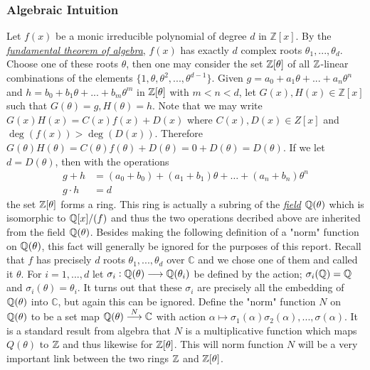   \subsubsection{Algebraic Intuition}
    Let $f(x)$ be a monic irreducible polynomial of degree $d$ in $\mathbb{Z}[x]$. By the \hyperref[fun]{\textit{fundamental theorem of algebra}}, $f(x)$ has exactly $d$ complex roots $\theta_1, ... , \theta_d$. Choose one of these roots $\theta$, then one may consider the set $\mathbb{Z}[\theta]$ of all $\mathbb{Z}$-linear combinations of the elements $\lbrace 1,\theta,\theta^2,...,\theta^{d-1} \rbrace $. Given $g =  a_0 + a_1\theta + ... + a_n\theta^n $ and $ h= b_0 + b_1 \theta + ... + b_m \theta^m $ in $ \mathbb{Z}[\theta]$ with $m < n < d$, let $G(x),H(x) \in \mathbb{Z}[x] $ such that $G(\theta) = g, H(\theta) = h $. Note that we may write $G(x)H(x) = C(x)f(x) + D(x)$ where $C(x), D(x) \in Z[x]$ and $\deg(f(x)) >  \deg (D(x))$. Therefore $ G(\theta) H(\theta) = C(\theta)f(\theta) + D(\theta) = 0 + D(\theta) = D(\theta) $. If we let $d = D(\theta)$, then with the operations  
    \begin{align*}
    g+ h &=  (a_0 + b_0) + (a_1 + b_1) \theta + \dots + (a_n + b_n )\theta^n \\
    g \cdot  h &= d
    \end{align*}
    the set $\mathbb{Z}[\theta]$ forms a ring. This ring is actually a subring of the \hyperref[field]{\textit{field}} $\mathbb{Q}(\theta)$ which is isomorphic to $\mathbb{Q}[x]/(f)$ and thus the two operations decribed above are inherited from the field $\mathbb{Q}(\theta)$. Besides making the following definition of a "norm" function on $\mathbb{Q}(\theta)$, this fact will generally be ignored for the purposes of this report. Recall that $f$ has precisely $d$ roots $\theta_1, ... , \theta_d$ over $\mathbb{C}$ and we chose one of them and called it $\theta$. For $i = 1,...,d$ let $\sigma_i : \mathbb{Q}(\theta) \longrightarrow \mathbb{Q}(\theta_i)$ be defined by the action; $\sigma_i(\mathbb{Q}) = \mathbb{Q}$ and $\sigma_i(\theta) = \theta_i$. It turns out that these $\sigma_i$ are precisely all the embedding of $\mathbb{Q}(\theta) $ into $\mathbb{C}$, but again this can be ignored. Define the "norm" function $N$ on $\mathbb{Q}(\theta)$ to be a set map $\mathbb{Q}(\theta) \overset{N}{\longrightarrow} \mathbb{C}$ with action $\alpha \mapsto \sigma_1(\alpha) \sigma_2(\alpha), ... , \sigma(\alpha)$. It is a standard result from algebra that $N$ is a multiplicative function which maps $Q(\theta)$ to $\mathbb{Z}$ and thus likewise for $\mathbb{Z}[\theta]$. This will norm function $N$ will be a very important link between the two rings $\mathbb{Z}$ and $\mathbb{Z}[\theta]$. \\


